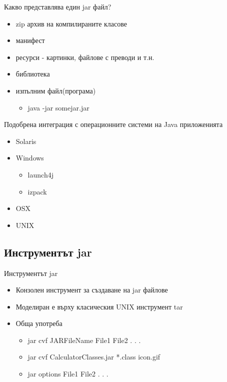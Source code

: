 \documentclass{beamer}
\begin{document}
\begin{frame}{Какво представлява един jar файл?}
  \transdissolve
  \begin{itemize}
  \item zip архив на компилираните класове
  \item манифест
  \item ресурси - картинки, файлове с преводи и т.н.
  \item библиотека
  \item изпълним файл(програма)
    \begin{itemize}
      \item java -jar somejar.jar
    \end{itemize}
  \end{itemize}
\end{frame}

\begin{frame}{Подобрена интеграция с операционните системи на Java приложенията}
  \transdissolve
  \begin{itemize}
  \item Solaris
  \item Windows
    \begin{itemize}
      \item launch4j
      \item izpack
    \end{itemize}
  \item OSX
  \item UNIX
  \end{itemize}
\end{frame}


\subsection{Инструментът jar}

\begin{frame}{Инструментът jar}
  \begin{itemize}
  \item Конзолен инструмент за създаване на jar файлове
  \item Моделиран е върху класическия UNIX инструмент tar
  \item Обща употреба
    \begin{itemize}
    \item jar cvf JARFileName File1 File2 . . .
    \item jar cvf CalculatorClasses.jar *.class icon.gif
    \item jar options File1 File2 . . .
    \end{itemize}
  \end{itemize}
\end{frame}
\end{document}
